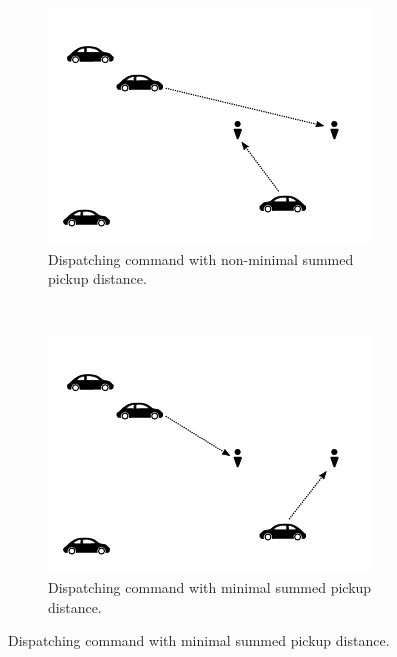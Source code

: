 \begin{figure}[h]
    \centering
    \begin{subfigure}[b]{0.3\textwidth}
        \includegraphics[width=\textwidth]{figures/RebalancingRedispatching1}
        \caption{Dispatching command with non-minimal summed pickup distance.}
        \label{fig:dispatch-subopt}
    \end{subfigure}
    ~ %
    \begin{subfigure}[b]{0.3\textwidth}
        \includegraphics[width=\textwidth]{figures/RebalancingRedispatching2}
        \caption{Dispatching command with minimal summed pickup distance.}
        \label{fig:dispatch-opt}

\end{subfigure}
\end{figure}
